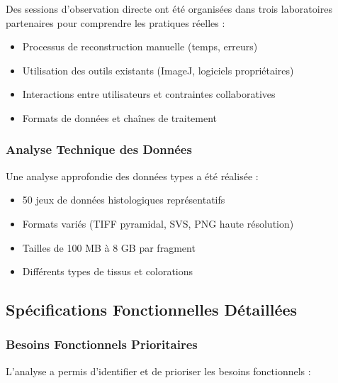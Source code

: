 \documentclass[12pt,a4paper]{report}
\begin{document}
Des sessions d'observation directe ont été organisées dans trois laboratoires partenaires pour comprendre les pratiques réelles :
\begin{itemize}
\item Processus de reconstruction manuelle (temps, erreurs)
\item Utilisation des outils existants (ImageJ, logiciels propriétaires)
\item Interactions entre utilisateurs et contraintes collaboratives
\item Formats de données et chaînes de traitement
\end{itemize}

\subsubsection{Analyse Technique des Données}

Une analyse approfondie des données types a été réalisée :
\begin{itemize}
\item 50 jeux de données histologiques représentatifs
\item Formats variés (TIFF pyramidal, SVS, PNG haute résolution)
\item Tailles de 100 MB à 8 GB par fragment
\item Différents types de tissus et colorations
\end{itemize}

\subsection{Spécifications Fonctionnelles Détaillées}

\subsubsection{Besoins Fonctionnels Prioritaires}

L'analyse a permis d'identifier et de prioriser les besoins fonctionnels :
\end{document}
